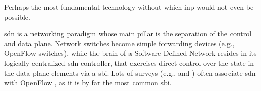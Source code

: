 Perhaps the most fundamental technology without which \gls{inp} would not even be possible.

\gls{sdn} is a networking paradigm whose main pillar is the separation of the control and data plane.
Network switches become simple forwarding devices (e.g., OpenFlow \cite{openflow} switches), while the brain of a Software Defined Network resides in its logically centralized \gls{sdn} controller, that exercises direct control over the state in the data plane elements via a \gls{sbi}.
Lots of surveys (e.g., \cite{kreutz2014software} and \cite{kim2013improving}) often associate \gls{sdn} with OpenFlow \cite{openflow}, as it is by far the most common \gls{sbi}.